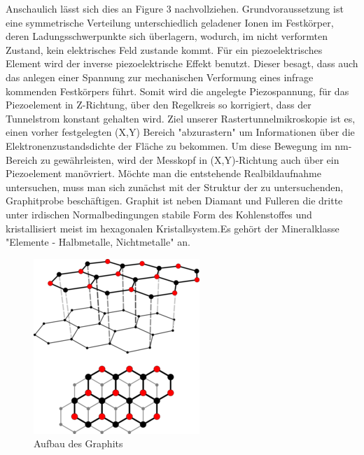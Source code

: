 \documentclass[10pt,a4paper]{article}
\begin{document}
	Anschaulich lässt sich dies an Figure 3 nachvollziehen. Grundvoraussetzung ist eine symmetrische Verteilung unterschiedlich geladener Ionen im Festkörper, deren Ladungsschwerpunkte sich überlagern, wodurch, im nicht verformten Zustand, kein elektrisches Feld zustande kommt. Für ein piezoelektrisches Element wird der inverse piezoelektrische Effekt benutzt. Dieser besagt, dass auch das anlegen einer Spannung zur mechanischen Verformung eines infrage kommenden Festkörpers führt. Somit wird die angelegte Piezospannung, für das Piezoelement in Z-Richtung, über den Regelkreis so korrigiert, dass der Tunnelstrom konstant gehalten wird. Ziel unserer Rastertunnelmikroskopie ist es, einen vorher festgelegten (X,Y) Bereich "abzurastern" um Informationen über die Elektronenzustandsdichte der Fläche zu bekommen. Um diese Bewegung im nm-Bereich zu gewährleisten, wird der Messkopf in (X,Y)-Richtung auch über ein Piezoelement manövriert. Möchte man die entstehende Realbildaufnahme untersuchen, muss man sich zunächst mit der Struktur der zu untersuchenden, Graphitprobe beschäftigen.
	Graphit ist neben Diamant und Fulleren die dritte unter irdischen Normalbedingungen stabile Form des Kohlenstoffes und kristallisiert meist im hexagonalen Kristallsystem.Es gehört der Mineralklasse "Elemente - Halbmetalle, Nichtmetalle" an. 
	\begin{figure}[h]
		\includegraphics[scale = 1.1]{Graphit.png}
		\centering
		\caption{Aufbau des Graphits}
		\label{diagramm_aufspaltung}
	\end{figure}
\end{document}
